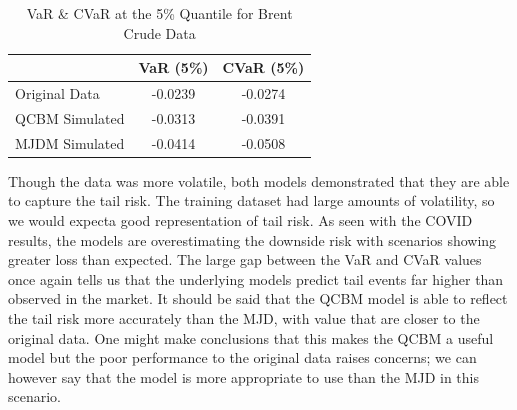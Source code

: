 \documentclass[12pt]{article}
\numberwithin{equation}{section}
\begin{document}
\begin{table}[h!]
\centering
\begin{tabular}{lcc}
\hline
\textbf{} & \textbf{VaR (5\%)} & \textbf{CVaR (5\%)} \\
\hline
Original Data     & -0.0239 & -0.0274 \\
QCBM Simulated    & -0.0313 & -0.0391 \\
MJDM Simulated    & -0.0414 & -0.0508 \\
\hline
\end{tabular}
\caption{VaR \& CVaR at the 5\% Quantile for Brent Crude Data}
\label{tab:cvar_5_brent}
\end{table}
Though the data was more volatile, both models demonstrated that they 
are able to capture the tail risk. The training dataset had large amounts of 
volatility, so we would expecta  good representation of tail risk. 
As seen with the COVID results, 
the models are overestimating the downside risk with scenarios showing 
greater loss than expected. The large gap between the VaR and CVaR values once 
again tells us that the underlying models predict tail events far higher than 
observed in the market. It should be said that the QCBM model is able to reflect 
the tail risk more accurately than the MJD, with value that are closer to the 
original data. One might make conclusions that this makes the QCBM a useful model 
but the poor performance to the original data raises concerns; we can however 
say that the model is more appropriate to use than the MJD in this scenario. 
\end{document}
